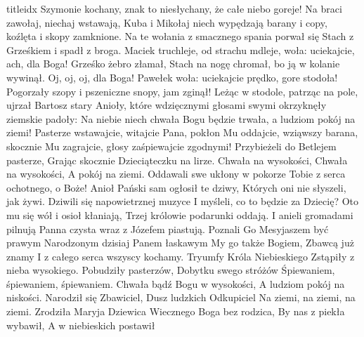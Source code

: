 \documentclass[a5paper, portrait, 12pt]{mwart}
\begin{document}
\begin{songs}{titleidx}
Szymonie kochany, znak to niesłychany,
że całe niebo goreje!
Na braci zawołaj, niechaj wstawają,
Kuba i Mikołaj niech wypędzają
barany i copy, koźlęta i skopy zamknione.
\endchorus
\beginverse
Na te wołania z smacznego spania
porwał się Stach z Grześkiem i spadł z broga.
Maciek truchleje, od strachu mdleje,
woła: uciekajcie, ach, dla Boga!
\endverse
\beginchorus
Grześko żebro złamał, Stach na nogę chromał,
bo ją w kolanie wywinął.
Oj, oj, oj, dla Boga! Pawełek woła:
uciekajcie prędko, gore stodoła!
Pogorzały szopy i pszeniczne snopy, jam zginął!
\endchorus
\beginverse
Leżąc w stodole, patrząc na pole,
ujrzał Bartosz stary Anioły,
które wdzięcznymi głosami swymi
okrzyknęły ziemskie padoły:
\endverse
\beginchorus
Na niebie niech chwała Bogu będzie trwała,
a ludziom pokój na ziemi!
Pasterze wstawajcie, witajcie Pana,
pokłon Mu oddajcie, wziąwszy barana,
skocznie Mu zagrajcie, głosy zaśpiewajcie zgodnymi!
\endchorus
\endsong
\beginverse
    Przybieżeli do Betlejem pasterze,
    Grając skocznie Dzieciąteczku na lirze.
\endverse
\beginchorus
	Chwała na wysokości,
	Chwała na wysokości,
	A pokój na ziemi.
\endchorus
\beginverse
    Oddawali swe ukłony w pokorze
    Tobie z serca ochotnego, o Boże!
\endverse
\beginverse
    Anioł Pański sam ogłosił te dziwy,
    Których oni nie słyszeli, jak żywi.
\endverse
\beginverse
    Dziwili się napowietrznej muzyce
    I myśleli, co to będzie za Dziecię?
\endverse
\beginverse
    Oto mu się wół i osioł kłaniają,
    Trzej królowie podarunki oddają.
\endverse
\beginverse
    I anieli gromadami pilnują
    Panna czysta wraz z Józefem piastują.
\endverse
\beginverse
    Poznali Go Mesyjaszem być prawym
    Narodzonym dzisiaj Panem łaskawym
\endverse
\beginverse
    My go także Bogiem, Zbawcą już znamy
    I z całego serca wszyscy kochamy.
\endverse
\endsong
\beginverse
    Tryumfy Króla Niebieskiego
    Zstąpiły z nieba wysokiego.
\endverse
\beginchorus
    Pobudziły pasterzów,
    Dobytku swego stróżów
    Śpiewaniem, śpiewaniem, śpiewaniem.
\endchorus
\beginverse
    Chwała bądź Bogu w wysokości,
    A ludziom pokój na niskości.
\endverse
\beginchorus
    Narodził się Zbawiciel,
    Dusz ludzkich Odkupiciel
    Na ziemi, na ziemi, na ziemi.
\endchorus
\beginverse
    Zrodziła Maryja Dziewica
    Wiecznego Boga bez rodzica,
\endverse
\beginchorus
    By nas z piekła wybawił,
    A w niebieskich postawił

\end{songs}
\end{document}
